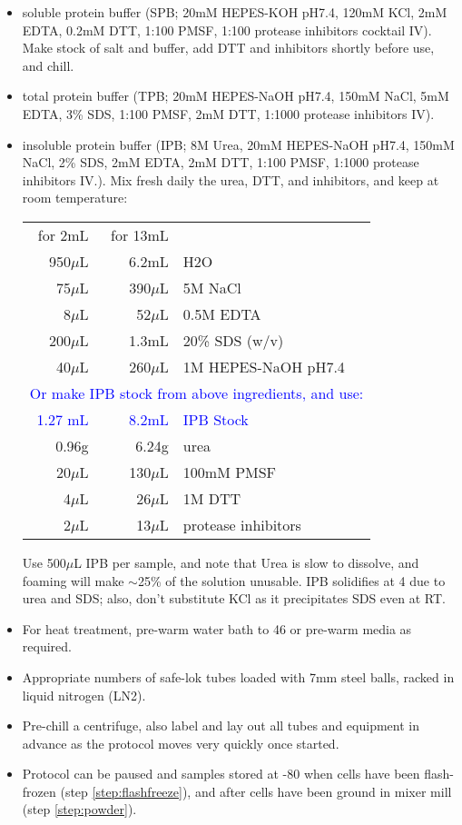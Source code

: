\documentclass{article}
\newcommand{\mul}{\ensuremath{\mu}L\xspace}
\newcommand{\degC}{\celsius\xspace}
\newcommand{\tb}[1]{\textcolor{blue}{#1}}
\begin{document}
\begin{itemize}
  \item soluble protein buffer (SPB; 20mM HEPES-KOH pH7.4, 120mM KCl, 2mM EDTA, 0.2mM DTT, 1:100 PMSF, 1:100 protease inhibitors cocktail IV). Make stock of salt and buffer, add DTT and inhibitors shortly before use, and chill.
\item total protein buffer (TPB;   20mM HEPES-NaOH pH7.4, 150mM NaCl, 5mM EDTA, 3\% SDS, 1:100 PMSF, 2mM DTT, 1:1000 protease inhibitors IV). 
  \item insoluble protein buffer (IPB; 8M Urea, 20mM HEPES-NaOH pH7.4, 150mM NaCl, 2\% SDS, 2mM EDTA, 2mM DTT, 1:100 PMSF, 1:1000 protease inhibitors IV.). Mix fresh daily the urea, DTT, and inhibitors, and keep at room temperature:
  
\begin{tabular}{rrl}
for 2mL & for 13mL & \\
950\mul & 6.2mL & H2O \\
75\mul &  390\mul & 5M NaCl \\
8\mul &  52\mul & 0.5M EDTA \\
200\mul & 1.3mL & 20\% SDS (w/v) \\
\ 40\mul & 260\mul & 1M HEPES-NaOH pH7.4 \\
\multicolumn{3}{l}{\tb{Or make IPB stock from above ingredients, and use:}} \\
\tb{1.27 mL} & \tb{8.2mL} & \tb{IPB Stock} \\
  0.96g &  6.24g & urea \\
\ 20\mul & 130\mul & 100mM PMSF \\
\ 4\mul & 26\mul & 1M DTT \\
\ \ 2\mul & 13\mul & protease inhibitors \\
\end{tabular}

  Use 500\mul IPB per sample, and note that Urea is slow to dissolve, and foaming will make $\sim$25\% of the solution unusable. IPB solidifies at 4\degC due to urea and SDS; also, don't substitute KCl as it precipitates SDS even at RT.

     \item For heat treatment, pre-warm water bath to 46\degC or pre-warm media as required.
      \item Appropriate numbers of safe-lok tubes loaded with 7mm steel balls, racked in liquid nitrogen (LN2).
    \item Pre-chill a centrifuge, also label and lay out all tubes and equipment in advance as the protocol moves very quickly once started. 
    \item Protocol can be paused and samples stored at -80\degC when cells have been flash-frozen (step \ref{step:flashfreeze}), and after cells have been ground in mixer mill (step \ref{step:powder}).
\end{itemize}
\end{document}
